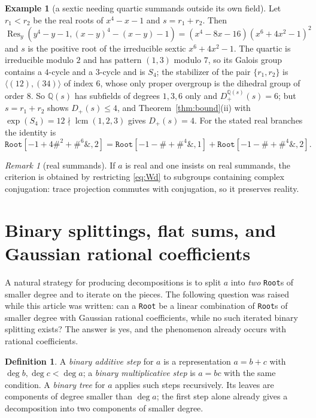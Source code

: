 \documentclass[11pt,a4paper]{article}
\theoremstyle{definition}
\newtheorem{definition}[theorem]{Definition}
\newtheorem{example}[theorem]{Example}
\theoremstyle{remark}
\newtheorem{remark}[theorem]{Remark}
\newcommand{\Q}{\mathbb{Q}}
\newcommand{\Res}{\operatorname{Res}}
\newcommand{\lcm}{\operatorname{lcm}}
\newcommand{\dg}{\deg}
\newcommand{\Dp}{D_{+}}
\newcommand{\code}[1]{\texttt{#1}}
\newcommand{\Root}{\code{Root}}
\begin{document}
\begin{example}[a sextic needing quartic summands outside its own field]\label{ex:quartic}
Let $r_1<r_2$ be the real roots of $x^4-x-1$ and $s=r_1+r_2$.  Then
$\Res_y(y^4-y-1,(x-y)^4-(x-y)-1)=(x^4-8x-16)(x^6+4x^2-1)^2$ and $s$ is the positive root of the
irreducible sextic $x^6+4x^2-1$.  The quartic is irreducible modulo $2$ and has pattern $(1,3)$ modulo
$7$, so its Galois group contains a $4$-cycle and a $3$-cycle and is $S_4$; the stabilizer of the pair
$\{r_1,r_2\}$ is $\langle(12),(34)\rangle$ of index $6$, whose only proper overgroup is the dihedral
group of order $8$.  So $\Q(s)$ has subfields of degrees $1,3,6$ only and $\Dp^{\Q(s)}(s)=6$; but
$s=r_1+r_2$ shows $\Dp(s)\le4$, and Theorem~\ref{thm:bound}(ii) with $\exp(S_4)=12\nmid\lcm(1,2,3)$
gives $\Dp(s)=4$.  For the stated real branches the identity is
\[
 \Root[-1+4\#^2+\#^6\&,2]
 =\Root[-1-\#+\#^4\&,1]+\Root[-1-\#+\#^4\&,2].
\]
\end{example}

\begin{remark}[real summands]\label{rem:real}
If $a$ is real and one insists on real summands, the criterion is obtained by restricting
\eqref{eq:Wd} to subgroups containing complex conjugation: trace projection commutes with conjugation,
so it preserves reality.
\end{remark}

\section{Binary splittings, flat sums, and Gaussian rational coefficients}\label{sec:binary}

A natural strategy for producing decompositions is to split $a$ into \emph{two} \Root{}s of smaller
degree and to iterate on the pieces.  The following question was raised while this article was
written: can a \Root{} be a linear combination of \Root{}s of smaller degree with Gaussian rational
coefficients, while no such iterated binary splitting exists?  The answer is yes, and the phenomenon
already occurs with rational coefficients.

\begin{definition}
A \emph{binary additive step} for $a$ is a representation $a=b+c$ with $\dg b,\dg c<\dg a$; a
\emph{binary multiplicative step} is $a=bc$ with the same condition.  A \emph{binary tree} for $a$
applies such steps recursively.  Its leaves are components of degree smaller than $\dg a$; the first
step alone already gives a decomposition into two components of smaller degree.
\end{definition}
\end{document}
